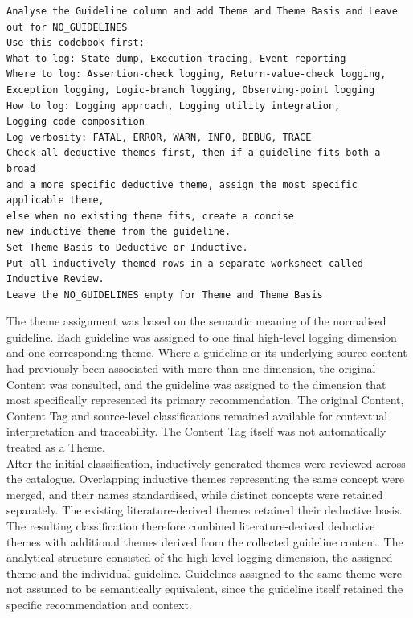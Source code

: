 \begin{listing}[H]
\begin{verbatim}
Analyse the Guideline column and add Theme and Theme Basis and Leave
out for NO_GUIDELINES
Use this codebook first:
What to log: State dump, Execution tracing, Event reporting
Where to log: Assertion-check logging, Return-value-check logging,
Exception logging, Logic-branch logging, Observing-point logging
How to log: Logging approach, Logging utility integration,
Logging code composition
Log verbosity: FATAL, ERROR, WARN, INFO, DEBUG, TRACE
Check all deductive themes first, then if a guideline fits both a broad
and a more specific deductive theme, assign the most specific applicable theme,
else when no existing theme fits, create a concise
new inductive theme from the guideline.
Set Theme Basis to Deductive or Inductive.
Put all inductively themed rows in a separate worksheet called Inductive Review.
Leave the NO_GUIDELINES empty for Theme and Theme Basis
\end{verbatim}
\caption{Prompt for deductive-inductive theme classification}
\label{lst:prompt_theme_classification}
\end{listing}

The theme assignment was based on the semantic meaning of the normalised
guideline. Each guideline was assigned to one final high-level logging
dimension and one corresponding theme. Where a guideline or its underlying
source content had previously been associated with more than one dimension,
the original Content was consulted, and the guideline was assigned to the
dimension that most specifically represented its primary recommendation.
The original Content, Content Tag and source-level classifications remained
available for contextual interpretation and traceability. The Content Tag
itself was not automatically treated as a Theme.
\\
After the initial classification, inductively generated themes were reviewed across
the catalogue. Overlapping inductive themes representing the same concept were merged, and their names standardised, while distinct concepts were retained separately. The
existing literature-derived themes retained their deductive basis.
\\
The resulting classification therefore combined literature-derived deductive themes
with additional themes derived from the collected guideline content. The analytical
structure consisted of the high-level logging dimension, the assigned theme and the
individual guideline. Guidelines assigned to the same theme were not assumed to be
semantically equivalent, since the guideline itself retained the specific recommendation
and context.

